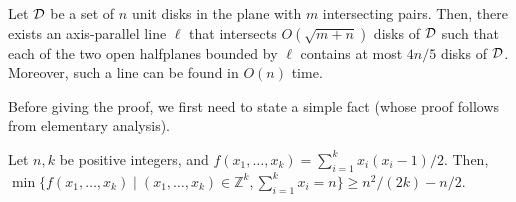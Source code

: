 \documentclass{llncs}
\begin{document}
\begin{theorem}
\label{thm:axis-parallel}
Let $\cal{D}$ be a set of $n$ unit disks in the plane with $m$ intersecting pairs.  
Then, there exists an axis-parallel line $\ell$ that intersects $O(\sqrt{m+n})$ disks of $\cal{D}$ such that each of the two open halfplanes bounded by $\ell$ contains at most $4n/5$ disks of $\cal{D}$.
Moreover, such a line can be found in $O(n)$ time.
\end{theorem}

Before giving the proof, we first need to state a simple fact (whose proof follows from elementary analysis). 
\begin{lemma}
\label{lem:uniform}
Let $n,k$ be positive integers, and 
$f(x_1, \dots, x_k) = \sum_{i=1}^k x_i(x_i-1)/2$.
Then, $\min\{f(x_1, \dots, x_k) \mid (x_1,\dots,x_k) \in \mathbb{Z}^k, \sum_{i=1}^k x_i = n\} \geq n^2/(2k) - n/2$.
\end{lemma}
\end{document}

